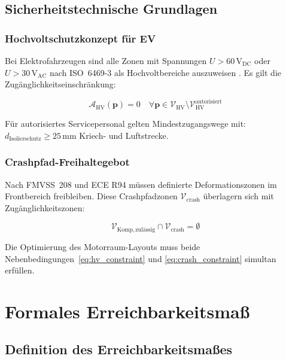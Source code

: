 ﻿\documentclass[12pt,a4paper]{article}
\begin{document}
\subsection{Sicherheitstechnische Grundlagen}

\subsubsection{Hochvoltschutzkonzept für EV}

Bei Elektrofahrzeugen sind alle Zonen mit Spannungen $U > 60\,\mathrm{V}_\mathrm{DC}$
oder $U > 30\,\mathrm{V}_\mathrm{AC}$ nach ISO~6469-3 als Hochvoltbereiche
auszuweisen \cite{ISO6469}. Es gilt die Zugänglichkeitseinschränkung:

\begin{equation}
	\mathcal{A}_\mathrm{HV}(\mathbf{p}) = 0 \quad \forall \mathbf{p} \in
	\mathcal{V}_\mathrm{HV} \setminus \mathcal{V}_\mathrm{HV}^\mathrm{autorisiert}
	\label{eq:hv_constraint}
\end{equation}

Für autorisiertes Servicepersonal gelten Mindestzugangswege mit:
$d_\mathrm{Isolierschutz} \geq 25\,\mathrm{mm}$ Kriech- und Luftstrecke.

\subsubsection{Crashpfad-Freihaltegebot}

Nach FMVSS~208 und ECE R94 müssen definierte Deformationszonen im Frontbereich
freibleiben. Diese Crashpfadzonen $\mathcal{V}_\mathrm{crash}$ überlagern sich
mit Zugänglichkeitszonen:

\begin{equation}
	\mathcal{V}_\mathrm{Komp,zulässig} \cap \mathcal{V}_\mathrm{crash} = \emptyset
	\label{eq:crash_constraint}
\end{equation}

Die Optimierung des Motorraum-Layouts muss beide Nebenbedingungen~\eqref{eq:hv_constraint}
und \eqref{eq:crash_constraint} simultan erfüllen.

\section{Formales Erreichbarkeitsmaß}
\label{sec:erreichbarkeit}

\subsection{Definition des Erreichbarkeitsmaßes}
\end{document}

